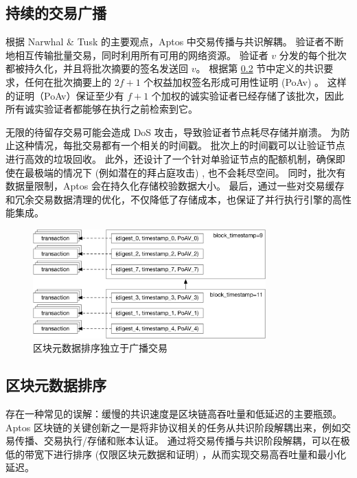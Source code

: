 \documentclass{article}
\begin{document}
\subsection{持续的交易广播}
\label{continuous_txn_dissemination}

根据 Narwhal \& Tusk \cite{narwhal_tusk} 的主要观点，Aptos 中交易传播与共识解耦。 验证者不断地相互传输批量交易，同时利用所有可用的网络资源。 验证者 $v$ 分发的每个批次都被持久化，并且将批次摘要的签名发送回 $v$。 根据第 \ref{subsec:block_metadata_ordering} 节中定义的共识要求，任何在批次摘要上的 $2f+1$  个权益加权签名形成可用性证明 (PoAv) 。 这样的证明（PoAv）保证至少有 $f+1$  个加权的诚实验证者已经存储了该批次，因此所有诚实验证者都能够在执行之前检索到它。

无限的待留存交易可能会造成 DoS 攻击，导致验证者节点耗尽存储并崩溃。 为防止这种情况，每批交易都有一个相关的时间戳。 批次上的时间戳可以让验证节点进行高效的垃圾回收。 此外，还设计了一个针对单验证节点的配额机制，确保即使在最极端的情况下 (例如潜在的拜占庭攻击) , 也不会耗尽空间。 同时，批次有数据量限制，Aptos 会在持久化存储校验数据大小。 最后，通过一些对交易缓存和冗余交易数据清理的优化，不仅降低了存储成本，也保证了并行执行引擎的高性能集成。


\begin{figure}
\centering
\includegraphics[width=0.8\textwidth]{ordering.pdf}
\caption{\label{fig:block}区块元数据排序独立于广播交易}
\end{figure}

\subsection{区块元数据排序}
\label{subsec:block_metadata_ordering}

存在一种常见的误解：缓慢的共识速度是区块链高吞吐量和低延迟的主要瓶颈。 Aptos 区块链的关键创新之一是将非协议相关的任务从共识阶段解耦出来，例如交易传播、交易执行/存储和账本认证。 通过将交易传播与共识阶段解耦，可以在极低的带宽下进行排序 (仅限区块元数据和证明) ，从而实现交易高吞吐量和最小化延迟。
\end{document}
